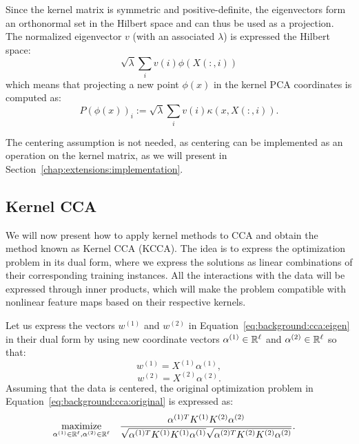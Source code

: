 Since the kernel matrix is symmetric and positive-definite, the eigenvectors form an orthonormal set in the Hilbert space and
can thus be used as a projection. The normalized eigenvector $v$ (with an associated $\lambda$) is expressed the Hilbert space:
$$ \sqrt{\lambda} \sum_i v(i) \phi(X(:,i))$$
which means that projecting a new point $\phi(x)$ in the kernel PCA coordinates is computed as:
$$P(\phi(x))_i := \sqrt{\lambda} \sum_i v(i) \kappa(x, X(:,i)).$$

The centering assumption is not needed, as centering can be implemented as an operation on the kernel matrix, as we will
present in Section~\ref{chap:extensions:implementation}.

\subsection{Kernel CCA}

We will now present how to apply kernel methods to CCA and obtain the method known as Kernel CCA (KCCA).
The idea is to express the optimization problem in its dual form, where we express the solutions as
linear combinations of their corresponding training instances. All the interactions with the data
will be expressed through inner products, which will make the problem compatible with nonlinear feature
maps based on their respective kernels.

Let us express the vectors $w^{(1)}$ and $w^{(2)}$ in Equation~\ref{eq:background:cca:eigen} in their
dual form by using new coordinate vectors $\alpha^{(1)} \in \mathbb{R}^\ell$ and $\alpha^{(2)} \in \mathbb{R}^\ell$
so that:
$$w^{(1)} = X^{(1)} \alpha^{(1)},$$
$$w^{(2)} = X^{(2)} \alpha^{(2)}.$$
Assuming that the data is centered, the original optimization problem in Equation~\ref{eq:background:cca:original}
is expressed as:
\begin{equation}\label{eq:background:cca:original}
\begin{aligned}
& \underset{\alpha^{(1)} \in \mathbb{R}^{\ell}, \alpha^{(2)} \in \mathbb{R}^{\ell}}{\text{maximize}}
& & \frac{\alpha^{(1)T} K^{(1)} K^{(2)} \alpha^{(2)}}{\sqrt{\alpha^{(1)T} K^{(1)}K^{(1)} \alpha^{(1)}} \sqrt{\alpha^{(2)T} K^{(2)}K^{(2)} \alpha^{(2)}}}.
\end{aligned}
\end{equation}

